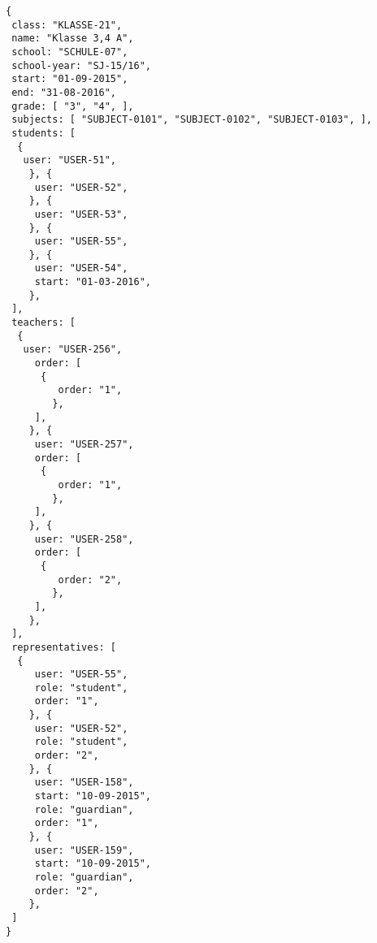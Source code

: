 
\begin{lstlisting}[caption={Klassen Datenmodel Beispiel 3: Jagangsübergreifende Klasse},frame=tlrb]
{
 class: "KLASSE-21",
 name: "Klasse 3,4 A",
 school: "SCHULE-07",
 school-year: "SJ-15/16",
 start: "01-09-2015",
 end: "31-08-2016",
 grade: [ "3", "4", ],
 subjects: [ "SUBJECT-0101", "SUBJECT-0102", "SUBJECT-0103", ],
 students: [
  { 
   user: "USER-51",
	}, { 
	 user: "USER-52",
	}, { 
	 user: "USER-53",
	}, { 
	 user: "USER-55",
	}, { 
	 user: "USER-54",
	 start: "01-03-2016",
	},
 ],
 teachers: [
  { 
   user: "USER-256",
	 order: [
	  {
		 order: "1",
		},
	 ],
	}, { 
	 user: "USER-257",
	 order: [
	  {
		 order: "1",
		},
	 ],
	}, { 
	 user: "USER-258",
	 order: [
	  {
		 order: "2",
		},
	 ],
	},
 ],
 representatives: [
  {
	 user: "USER-55",
	 role: "student",
	 order: "1",	 
	}, {
	 user: "USER-52",
	 role: "student",
	 order: "2",	 
	}, {
	 user: "USER-158",
	 start: "10-09-2015",
	 role: "guardian",
	 order: "1",	 
	}, {
	 user: "USER-159",
	 start: "10-09-2015",
	 role: "guardian",
	 order: "2",	 
	},  
 ]
}
\end{lstlisting}